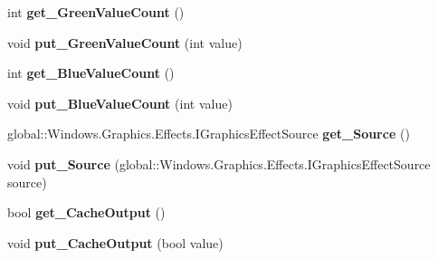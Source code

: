 \begin{DoxyCompactItemize}
int {\bfseries get\+\_\+\+Green\+Value\+Count} ()
\item 
\mbox{\label{class_microsoft_1_1_graphics_1_1_canvas_1_1_effects_1_1_posterize_effect_a6593407945b9d62ca06a95159520e2ed}} 
void {\bfseries put\+\_\+\+Green\+Value\+Count} (int value)
\item 
\mbox{\label{class_microsoft_1_1_graphics_1_1_canvas_1_1_effects_1_1_posterize_effect_a81e9068cc49d7eae29ce2bab9bb7aaee}} 
int {\bfseries get\+\_\+\+Blue\+Value\+Count} ()
\item 
\mbox{\label{class_microsoft_1_1_graphics_1_1_canvas_1_1_effects_1_1_posterize_effect_ac01cf744fadf660ebc0fc5663f030c2e}} 
void {\bfseries put\+\_\+\+Blue\+Value\+Count} (int value)
\item 
\mbox{\label{class_microsoft_1_1_graphics_1_1_canvas_1_1_effects_1_1_posterize_effect_aa661492313b9d0c37269c6dee9860737}} 
global\+::\+Windows.\+Graphics.\+Effects.\+I\+Graphics\+Effect\+Source {\bfseries get\+\_\+\+Source} ()
\item 
\mbox{\label{class_microsoft_1_1_graphics_1_1_canvas_1_1_effects_1_1_posterize_effect_a5146ff4277425d217f3182f44039629a}} 
void {\bfseries put\+\_\+\+Source} (global\+::\+Windows.\+Graphics.\+Effects.\+I\+Graphics\+Effect\+Source source)
\item 
\mbox{\label{class_microsoft_1_1_graphics_1_1_canvas_1_1_effects_1_1_posterize_effect_a8da67307d58c749e853472163f7df209}} 
bool {\bfseries get\+\_\+\+Cache\+Output} ()
\item 
\mbox{\label{class_microsoft_1_1_graphics_1_1_canvas_1_1_effects_1_1_posterize_effect_a80d62f9afb9dade352f76226ae5a3ccc}} 
void {\bfseries put\+\_\+\+Cache\+Output} (bool value)
\item 

\end{DoxyCompactItemize}
